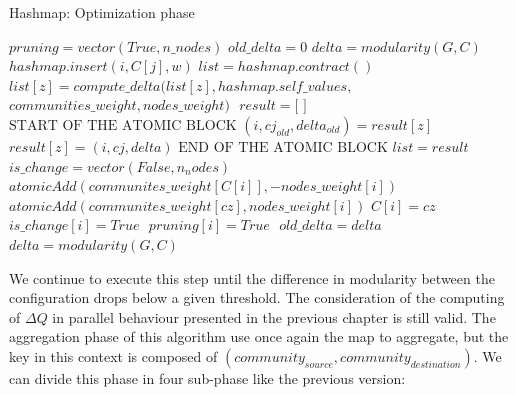 \begin{algorithm}
	\caption{Hashmap: Optimization phase}\label{alg:hash-optimization}
	\begin{algorithmic}
		\State $pruning = vector(True, n\_nodes)$
		\State $old\_delta = 0$
		\State $delta = modularity(G,C)$
		\State $ $
		\State $ $
		\State $hashmap.insert(i,C[j],w)$
		\EndIf
		\EndFor 
		\State $list = hashmap.contract()$
		\State $ $
		\State $list[z] = compute\_delta(list[z], hashmap.self\_values,$ 
		\Statex[10] $communities\_weight, nodes\_weight)$
		\EndFor
		\State $ $
		\State $result = \text{[ ]}$
		\State $\text{START OF THE ATOMIC BLOCK} $
		\State $(i, cj_{old}, delta_{old}) = result[z]$
		\State $result[z] = (i, cj, delta)$ 
		\EndIf
		\State $\text{END OF THE ATOMIC BLOCK} $
		\EndFor
		\State $list = result$
		\State $ $
		\State $is\_change = vector(False, n_nodes)$
		\State $atomicAdd(communites\_weight[C[i]], -nodes\_weight[i])$
		\State $atomicAdd(communites\_weight[cz], nodes\_weight[i])$
		\State $C[i] = cz$
		\State $is\_change[i] = True$
		\EndIf
		\EndFor
		\State $ $
		\State $pruning[i] = True$
		\EndIf
		\EndFor
		\State $ $
		\State $old\_delta = delta$
		\State $delta = modularity(G,C)$
		\EndWhile
		\EndProcedure
	\end{algorithmic}
\end{algorithm}
\newpage
\noindent
We continue to execute this step until the difference in modularity between the configuration drops below a given threshold. The consideration of the computing of $\Delta Q$ in parallel behaviour presented in the previous chapter is still valid. 
The aggregation phase of this algorithm use once again the map to aggregate, but the key in this context is composed of $(community_{source}, community_{destination})$. We can divide this phase in four sub-phase like the previous version:
